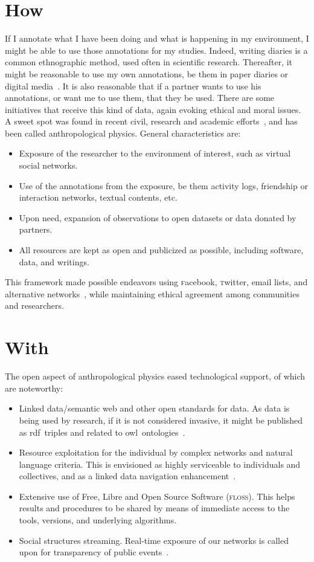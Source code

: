 \documentclass[a4paper, 11pt]{article} %
\newcommand{\twitter}{\textsc{t}witter}
\newcommand{\facebook}{\textsc{f}acebook}
\newcommand{\floss}{\textsc{floss}}
\newcommand{\owl}{{\sc owl}}
\newcommand{\rdf}{{\sc rdf}}
\begin{document}
\section*{How}
If I annotate what I have been doing and what is happening in my environment, I might be able to use those annotations for my studies.
Indeed, writing diaries is a common ethnographic method, used often in scientific research. Thereafter, it might be reasonable
to use my own annotations, be them in paper diaries or digital media~\cite{wolfram}. It is also reasonable that if a partner wants to use his annotations, or want me to use them, that they be used. There are some initiatives that receive this kind of data, again evoking ethical and moral issues. A sweet spot was found in recent civil, research and academic efforts~\cite{pnud5,ensaio}, and has been called anthropological physics. General characteristics are:

\begin{itemize}
    \item Exposure of the researcher to the environment of interest, such as virtual social networks.
    \item Use of the annotations from the exposure, be them activity logs, friendship or interaction networks, textual contents, etc.
    \item Upon need, expansion of observations to open datasets or data donated by partners.
    \item All resources are kept as open and publicized as possible, including software, data, and writings.
\end{itemize}

This framework made possible endeavors using \facebook, \twitter, email lists, and alternative networks~\cite{ars,ocupagov,stabNet,textNet,pnud5}, while maintaining ethical agreement among communities and researchers.

\section*{With}
The open aspect of anthropological physics eased technological support, of which are noteworthy:
\begin{itemize}
    \item Linked data/semantic web and other open standards for data. As data is being used by research, if it is not considered invasive, it might be published as \rdf\ triples and related to \owl\ ontologies~\cite{LOD,linkedDataBook,pnud5}.
    \item Resource exploitation for the individual by complex networks and natural language criteria. This is envisioned as highly serviceable to individuals and collectives, and as a linked data navigation enhancement~\cite{pnud3,pnud4}.
    \item Extensive use of Free, Libre and Open Source Software (\floss). This helps results and procedures to be shared by means of immediate access to the tools, versions, and underlying algorithms.
    \item Social structures streaming. Real-time exposure of our networks is called upon for transparency of public events~\cite{ocupagov}.
\end{itemize}
\end{document}
